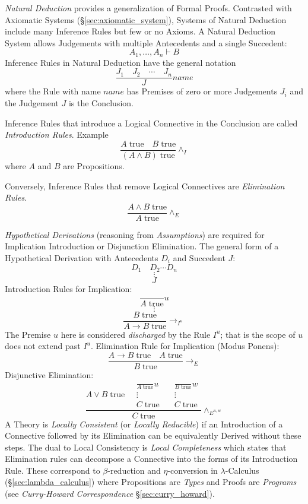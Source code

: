 \emph{Natural Deduction} provides a generalization of Formal Proofs.
Contrasted with Axiomatic Systems (\S\ref{sec:axiomatic_system}),
Systems of Natural Deduction include many Inference Rules but few or
no Axioms. A Natural Deduction System allows Judgements with multiple
Antecedents and a single Succedent:
\[
    A_1,\ldots,A_n \vdash B
\]
Inference Rules in Natural Deduction have the general notation
\[
    {
        \frac{J_1 \quad J_2 \quad \cdots \quad J_n}
        {J}
    } name
\]
where the Rule with name $name$ has Premises of zero or more
Judgements $J_i$ and the Judgement $J$ is the Conclusion.

Inference Rules that introduce a Logical Connective in the Conclusion
are called \emph{Introduction Rules}. Example
\[
    {
        \frac{A\;\mathrm{true} \quad B\;\mathrm{true}}
        {(A \wedge B)\;\mathrm{true}}
    } \wedge_I
\]
where $A$ and $B$ are Propositions.

Conversely, Inference Rules that remove Logical Connectives are
\emph{Elimination Rules}.
\[
    {
        \frac{A \wedge B\;\mathrm{true}}
        {A\;\mathrm{true}}
    } \wedge_E
\]

\emph{Hypothetical Derivations} (reasoning from \emph{Assumptions})
are required for Implication Introduction or Disjunction
Elimination. The general form of a Hypothetical Derivation with
Antecedents $D_i$ and Succedent $J$:
\[
    D_1 \quad D_2 \cdots D_n
\]\[
    \vdots
\]\[
    J
\]
Introduction Rules for Implication:
\[
    {
        \frac{}
        {A\;\mathrm{true}}
    } u
\]\[
    \vdots
\]\[
    {
        \frac{B\;\mathrm{true}}
        {A \rightarrow B\;\mathrm{true}}
    } \rightarrow_{I^u}
\]
The Premise $u$ here is considered \emph{discharged} by the Rule
$I^u$; that is the scope of $u$ does not extend past $I^u$.
Elimination Rule for Implication (Modus Ponens):
\[
    {
        \frac{A \rightarrow B\;\mathrm{true} \quad A\;\mathrm{true}}
        {B\;\mathrm{true}}
    } \rightarrow_{E}
\]
Disjunctive Elimination:
\[
    \frac{
    A \vee B\;\mathrm{true} \quad
    \begin{matrix}
        {
            \frac{}
            {A\;\mathrm{true}}
        }u \\
        \vdots \\
        C\;\mathrm{true}
    \end{matrix}
    \quad
    \begin{matrix}
        {
            \frac{}
            {B\;\mathrm{true}}
        }w \\
        \vdots \\
        C\;\mathrm{true}
    \end{matrix}
    }{ C\;\mathrm{true}}\wedge_{E^{u,w}}
\]
A Theory is \emph{Locally Consistent} (or \emph{Locally Reducible}) if
an Introduction of a Connective followed by its Elimination can be
equivalently Derived without these steps. The dual to Local
Consistency is \emph{Local Completeness} which states that Elimination
rules can decompose a Connective into the forms of its Introduction
Rule. These correspond to $\beta$-reduction and $\eta$-conversion in
$\lambda$-Calculus (\S\ref{sec:lambda_calculus}) where Propositions
are \emph{Types} and Proofs are \emph{Programs} (see
\emph{Curry-Howard Correspondence} \S\ref{sec:curry_howard}).

